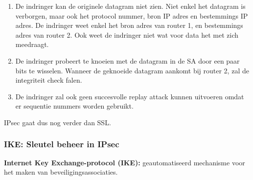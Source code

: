 \begin{enumerate}
    \item De indringer kan de originele datagram niet zien. Niet enkel het datagram is verborgen, maar ook het protocol nummer, bron IP adres en bestemmings IP adres. De indringer weet enkel het bron adres van router 1, en bestemmings adres van router 2. Ook weet de indringer niet wat voor data het met zich meedraagt.
\item De indringer probeert te knoeien met de datagram in de SA door een paar bits te wisselen. Wanneer de geknoeide datagram aankomt bij router 2, zal de integriteit check falen.
\item De indringer zal ook geen succesvolle replay attack kunnen uitvoeren omdat er sequentie nummers worden gebruikt.
\end{enumerate}

IPsec gaat dus nog verder dan SSL.

\clearpage

\subsubsection{IKE: Sleutel beheer in IPsec}

\textbf{Internet Key Exchange-protocol (IKE):} geautomatiseerd mechanisme voor het maken van beveiligingsassociaties.

